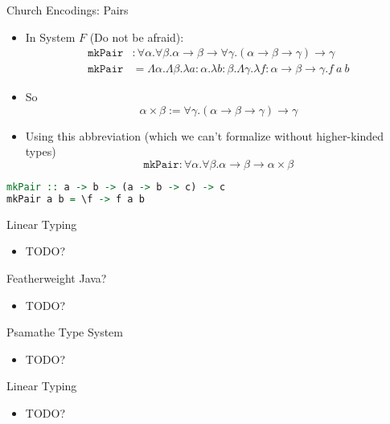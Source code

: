 \documentclass[leqno,presentation,usenames,dvipsnames]{beamer}
\begin{document}
\begin{frame}[fragile]{Church Encodings: Pairs}
    \begin{itemize}
        \item In System $F$ (Do not be afraid):
\begin{align*}
    \texttt{mkPair} &: \forall \alpha. \forall \beta. \alpha \to \beta \to \forall \gamma. (\alpha \to \beta \to \gamma) \to \gamma \\
    \texttt{mkPair} &= \Lambda \alpha. \Lambda \beta. \lambda a : \alpha. \lambda b : \beta. \Lambda \gamma. \lambda f : \alpha \to \beta \to \gamma. f~a~b
\end{align*}
        \item So
\[
    \alpha \times \beta := \forall \gamma. (\alpha \to \beta \to \gamma) \to \gamma
\]
        \item Using this abbreviation (which we can't formalize without higher-kinded types)
\[
    \texttt{mkPair} : \forall \alpha. \forall \beta. \alpha \to \beta \to \alpha \times \beta
\]
    \end{itemize}
\begin{lstlisting}[language=haskell, basicstyle=\small\ttfamily]
mkPair :: a -> b -> (a -> b -> c) -> c
mkPair a b = \f -> f a b
\end{lstlisting}
\end{frame}

\begin{frame}{Linear Typing}
    \begin{itemize}
        \item TODO?
    \end{itemize}
\end{frame}

\begin{frame}{Featherweight Java?}
    \begin{itemize}
        \item TODO?
    \end{itemize}
\end{frame}

\begin{frame}{Psamathe Type System}
    \begin{itemize}
        \item TODO?
    \end{itemize}
\end{frame}

\begin{frame}{Linear Typing}
    \begin{itemize}
        \item TODO?
    \end{itemize}
\end{frame}
\end{document}
